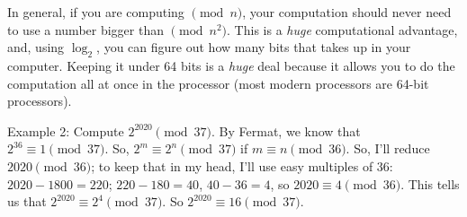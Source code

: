 \documentclass[12pt]{article}
\begin{document}
In general, if you are computing $\pmod{n}$, your computation should never need to use a number bigger than $\pmod{n^2}$.  This is a \emph{huge} computational advantage, and, using $\log_2$, you can figure out how many bits that takes up in your computer.  Keeping it under 64 bits is a \emph{huge} deal because it allows you to do the computation all at once in the processor (most modern processors are 64-bit processors).

{\sc Example 2}: Compute $2^{2020} \pmod{37}$.  By Fermat, we know that $2^{36} \equiv 1 \pmod{37}$.  So, $2^m \equiv 2^n \pmod{37}$ if $m \equiv n \pmod{36}$.  So, I'll reduce $2020 \pmod {36}$; to keep that in my head, I'll use easy multiples of 36: $2020-1800 = 220$; $220-180=40$, $40-36=4$, so $2020 \equiv 4 \pmod{36}$.  This tells us that $2^{2020} \equiv 2^4 \pmod{37}$.  So $2^{2020} \equiv 16 \pmod{37}$.
\end{document}
